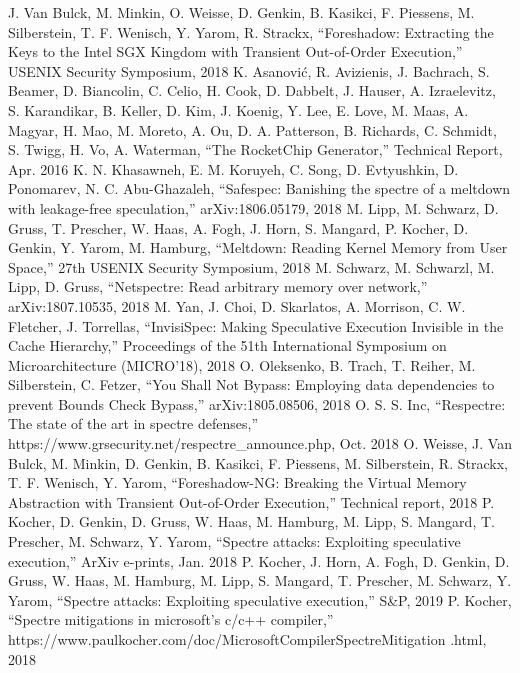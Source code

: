 \begin{thebibliography}{00}
     J. Van Bulck, M. Minkin, O. Weisse, D. Genkin, B. Kasikci, F. Piessens, M. Silberstein, T. F. Wenisch, Y. Yarom, R. Strackx, ``Foreshadow: Extracting the Keys to the Intel SGX Kingdom with Transient Out-of-Order Execution,'' USENIX Security Symposium, 2018
     K. Asanović, R. Avizienis, J. Bachrach, S. Beamer, D. Biancolin, C. Celio, H. Cook, D. Dabbelt, J. Hauser, A. Izraelevitz, S. Karandikar, B. Keller, D. Kim, J. Koenig, Y. Lee, E. Love, M. Maas, A. Magyar, H. Mao, M. Moreto, A. Ou, D. A. Patterson, B. Richards, C. Schmidt, S. Twigg, H. Vo, A. Waterman, ``The RocketChip Generator,'' Technical Report, Apr. 2016
     K. N. Khasawneh, E. M. Koruyeh, C. Song, D. Evtyushkin, D. Ponomarev, N. C. Abu-Ghazaleh, ``Safespec: Banishing the spectre of a meltdown with leakage-free speculation,'' arXiv:1806.05179, 2018
     M. Lipp, M. Schwarz, D. Gruss, T. Prescher, W. Haas, A. Fogh, J. Horn, S. Mangard, P. Kocher, D. Genkin, Y. Yarom, M. Hamburg, ``Meltdown: Reading Kernel Memory from User Space,'' 27th USENIX Security Symposium, 2018
     M. Schwarz, M. Schwarzl, M. Lipp, D. Gruss, ``Netspectre: Read arbitrary memory over network,'' arXiv:1807.10535, 2018
     M. Yan, J. Choi, D. Skarlatos, A. Morrison, C. W. Fletcher, J. Torrellas, ``InvisiSpec: Making Speculative Execution Invisible in the Cache Hierarchy,'' Proceedings of the 51th International Symposium on Microarchitecture (MICRO’18), 2018
     O. Oleksenko, B. Trach, T. Reiher, M. Silberstein, C. Fetzer, ``You Shall Not Bypass: Employing data dependencies to prevent Bounds Check Bypass,'' arXiv:1805.08506, 2018
     O. S. S. Inc, ``Respectre: The state of the art in spectre defenses,'' https://www.grsecurity.net/respectre\_announce.php, Oct. 2018
     O. Weisse, J. Van Bulck, M. Minkin, D. Genkin, B. Kasikci, F. Piessens, M. Silberstein, R. Strackx, T. F. Wenisch, Y. Yarom, ``Foreshadow-NG: Breaking the Virtual Memory Abstraction with Transient Out-of-Order Execution,'' Technical report, 2018
     P. Kocher, D. Genkin, D. Gruss, W. Haas, M. Hamburg, M. Lipp, S. Mangard, T. Prescher, M. Schwarz, Y. Yarom, ``Spectre attacks: Exploiting speculative execution,'' ArXiv e-prints, Jan. 2018
     P. Kocher, J. Horn, A. Fogh, D. Genkin, D. Gruss, W. Haas, M. Hamburg, M. Lipp, S. Mangard, T. Prescher, M. Schwarz, Y. Yarom, ``Spectre attacks: Exploiting speculative execution,'' S\&P, 2019
     P. Kocher, ``Spectre mitigations in microsoft’s c/c++ compiler,'' https://www.paulkocher.com/doc/MicrosoftCompilerSpectreMitigation .html, 2018

\end{thebibliography}
